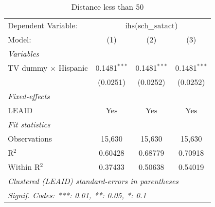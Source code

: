 \begin{table}[htbp]
\centering
\caption{Distance less than 50}
\begin{tabular}{lccc}
\tabularnewline\midrule\midrule
Dependent Variable:&\multicolumn{3}{c}{ihs(sch\_satact)}\\
Model:&(1) & (2) & (3)\\
\midrule \emph{Variables}&   &   &  \\
TV dummy $\times$ Hispanic & 0.1481$^{***}$ & 0.1481$^{***}$ & 0.1481$^{***}$\\
  &(0.0251) & (0.0252) & (0.0252)\\
\midrule \emph{Fixed-effects}&   &   &  \\
LEAID & Yes & Yes & Yes\\
\midrule \emph{Fit statistics}&  & & \\
Observations & 15,630&15,630&15,630\\
R$^2$ & 0.60428&0.68779&0.70918\\
Within R$^2$ & 0.37433&0.50638&0.54019\\
\midrule\midrule\multicolumn{4}{l}{\emph{Clustered (LEAID) standard-errors in parentheses}}\\
\multicolumn{4}{l}{\emph{Signif. Codes: ***: 0.01, **: 0.05, *: 0.1}}\\
\end{tabular}
\end{table}

